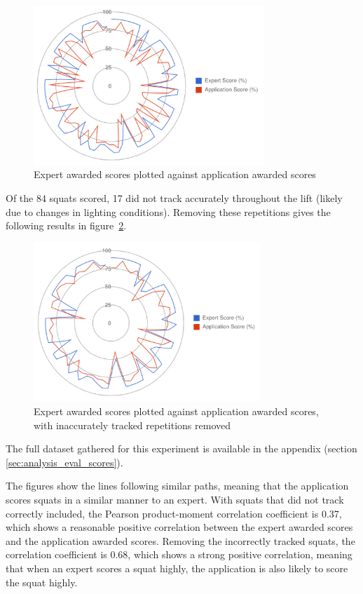 \begin{figure}[H]
    \centering
	\includegraphics[height=6cm]{evaluation/images/scores_difference}
\caption{Expert awarded scores plotted against application awarded scores}
\label{fig:scorediff}
\end{figure}

Of the 84 squats scored, 17 did not track accurately throughout the lift (likely due to changes in lighting conditions). Removing these repetitions gives the following results in figure~\ref{fig:scorediffgood}.

\begin{figure}[H]
    \centering
	\includegraphics[height=6cm]{evaluation/images/scores_difference_goodtrack}
\caption{Expert awarded scores plotted against application awarded scores, with inaccurately tracked repetitions removed}
\label{fig:scorediffgood}
\end{figure}

The full dataset gathered for this experiment is available in the appendix (section \ref{sec:analysis_eval_scores}).

The figures show the lines following similar paths, meaning that the application scores squats in a similar manner to an expert. With squats that did not track correctly included, the Pearson product-moment correlation coefficient is 0.37, which shows a reasonable positive correlation between the expert awarded scores and the application awarded scores. Removing the incorrectly tracked squats, the correlation coefficient is 0.68, which shows a strong positive correlation, meaning that when an expert scores a squat highly, the application is also likely to score the squat highly.

